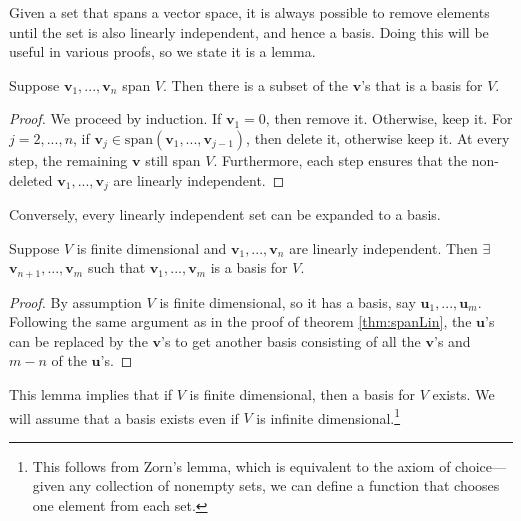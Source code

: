 Given a set that spans a vector space, it is always possible to remove
elements until the set is also linearly independent, and hence a
basis. Doing this will be useful in various proofs, so we state it is
a lemma.
\begin{lemma}\label{lem:spanToBasis}
  Suppose $\mathbf{v}_1, ..., \mathbf{v}_n$ span $V$. Then there is a
  subset of the $\mathbf{v}$'s that is a basis for $V$.
\end{lemma}
\begin{proof}
  We proceed by induction. If $\mathbf{v}_1 = 0$, then remove
  it. Otherwise, keep it. For $j=2,..., n$, if $\mathbf{v}_j \in
  \text{span}(\mathbf{v}_1, ..., \mathbf{v}_{j-1})$, then delete it,
  otherwise keep it. At every step, the remaining $\mathbf{v}$ still
  span $V$. Furthermore, each step ensures that the non-deleted
  $\mathbf{v}_1, ..., \mathbf{v}_j$ are linearly independent. 
\end{proof}
Conversely, every linearly independent set can be expanded to a
basis. 
\begin{lemma}\label{lem:linToBasis}
  Suppose $V$ is finite dimensional and $\mathbf{v}_1, ...,
  \mathbf{v}_n$ are linearly independent.  Then $\exists$
  $\mathbf{v}_{n+1}, ... , \mathbf{v}_m$ such that $\mathbf{v}_1, ...,
  \mathbf{v}_m$ is a basis for $V$.
\end{lemma}
\begin{proof}
  By assumption $V$ is finite dimensional, so it has a basis, say
  $\mathbf{u}_1, ..., \mathbf{u}_m$. Following the same argument as in
  the proof of theorem \ref{thm:spanLin}, the $\mathbf{u}$'s can be
  replaced by the $\mathbf{v}$'s to get another basis consisting of
  all the $\mathbf{v}$'s and $m-n$ of the $\mathbf{u}$'s.
\end{proof}
This lemma implies that if $V$ is finite dimensional, then a basis for
$V$ exists. We will assume that a basis exists even if $V$ is infinite
dimensional.\footnote{This follows from Zorn's lemma,
  which is equivalent to the axiom of choice---given any collection of
  nonempty sets, we can define a function that chooses one element
  from each set.} 

